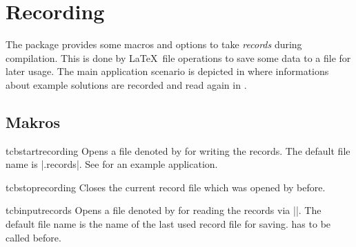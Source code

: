 \clearpage
\section{Recording}\label{sec:recording}%
%
The package provides some macros and options to take \emph{records} during
compilation. This is done by \LaTeX\ file operations to save some data
to a file for later usage. The main application scenario is depicted in
 where
informations about example solutions are recorded and read again
in .

\subsection{Makros}\label{sec:recording-makros}
\begin{docCommand}[doc new=2014-11-28]{tcbstartrecording}{}
  Opens a file denoted by  for writing the records.
  The default file name is |\jobname.records|.
  See  for an example application.
\end{docCommand}


\begin{docCommand}[doc new=2014-11-28]{tcbstoprecording}{}
  Closes the current record file which was opened by 
  before.
\end{docCommand}

\begin{docCommand}[doc new=2014-11-28]{tcbinputrecords}{}
  Opens a file denoted by  for reading the records via ||.
  The default file name is the name of the last used record file for saving.
   has to be called before.
\end{docCommand}


